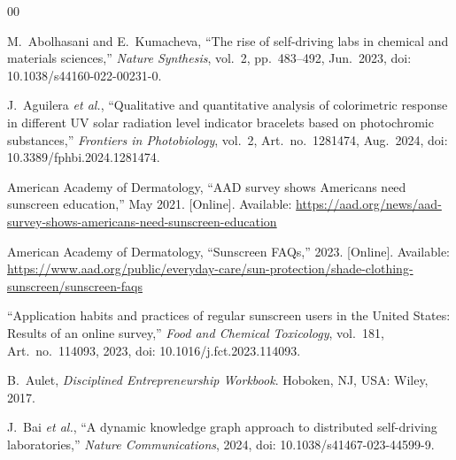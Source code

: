 \documentclass[12pt,a4paper]{article}
\numberwithin{table}{section}    %
\numberwithin{figure}{section}   %
\begin{document}
\clearpage
\renewcommand{\bibsection}{\section*{References}\addcontentsline{toc}{section}{References}}
\begin{thebibliography}{00}


M.~Abolhasani and E.~Kumacheva, ``The rise of self-driving labs in chemical and materials sciences,''
\emph{Nature Synthesis}, vol.~2, pp.~483--492, Jun.~2023, doi: 10.1038/s44160-022-00231-0.

J.~Aguilera \emph{et al.}, ``Qualitative and quantitative analysis of colorimetric response in different UV solar
radiation level indicator bracelets based on photochromic substances,'' \emph{Frontiers in Photobiology}, vol.~2,
Art.~no.~1281474, Aug.~2024, doi: 10.3389/fphbi.2024.1281474.

American Academy of Dermatology, ``AAD survey shows Americans need sunscreen education,'' May 2021.
[Online]. Available: \url{https://aad.org/news/aad-survey-shows-americans-need-sunscreen-education}

American Academy of Dermatology, ``Sunscreen FAQs,'' 2023. [Online]. Available:
\url{https://www.aad.org/public/everyday-care/sun-protection/shade-clothing-sunscreen/sunscreen-faqs}

``Application habits and practices of regular sunscreen users in the United States: Results of an online survey,''
\emph{Food and Chemical Toxicology}, vol.~181, Art.~no.~114093, 2023, doi: 10.1016/j.fct.2023.114093.

B.~Aulet, \emph{Disciplined Entrepreneurship Workbook}. Hoboken, NJ, USA: Wiley, 2017.

J.~Bai \emph{et al.}, ``A dynamic knowledge graph approach to distributed self-driving laboratories,''
\emph{Nature Communications}, 2024, doi: 10.1038/s41467-023-44599-9.


\end{thebibliography}
\end{document}
